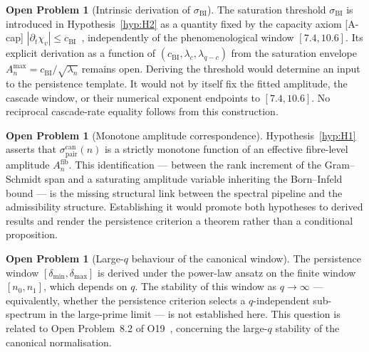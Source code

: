 \documentclass[11pt,a4paper]{article}
\theoremstyle{definition}
\newtheorem{openproblem}[theorem]{Open Problem}
\theoremstyle{remark}
\begin{document}
      \begin{openproblem}[Intrinsic derivation of $\sigma_{\mathrm{BI}}$]
        \label{op:sigma-BI-disc}
        The saturation threshold $\sigma_{\mathrm{BI}}$ is introduced in
        Hypothesis~\ref{hyp:H2} as a quantity fixed by the capacity axiom
        [A-cap] $|\partial_t \chi_v| \leq c_{\mathrm{BI}}$~\cite{Beau2026c},
        independently of the phenomenological window $[7.4, 10.6]$.
        Its explicit derivation as a function of $(c_{\mathrm{BI}}, \lambda_c,
        \lambda_{q-c})$ from the saturation envelope
        $A_n^{\max} = c_{\mathrm{BI}} / \sqrt{\lambda_n}$ remains open.
        Deriving the threshold would determine an input to the persistence template.
        It would not by itself fix the fitted amplitude, the cascade window, or their numerical
        exponent endpoints to $[7.4,10.6]$.
        No reciprocal cascade-rate equality follows from this construction.
      \end{openproblem}

      \begin{openproblem}[Monotone amplitude correspondence]
        \label{op:H1-derivation}
        Hypothesis~\ref{hyp:H1} asserts that
        $\sigma_{\mathrm{pair}}^{\mathrm{can}}(n)$ is a strictly monotone
        function of an effective fibre-level amplitude
        $A_n^{\mathrm{fib}}$.
        This identification --- between the rank increment of the
        Gram--Schmidt span and a saturating amplitude variable inheriting
        the Born--Infeld bound --- is the missing structural link between
        the spectral pipeline and the admissibility structure.
        Establishing it would promote both hypotheses to derived results and
        render the persistence criterion a theorem rather than a conditional
        proposition.
      \end{openproblem}

      \begin{openproblem}[Large-$q$ behaviour of the canonical window]
        \label{op:large-q}
        The persistence window $[\delta_{\min}, \delta_{\max}]$ is derived
        under the power-law ansatz on the finite window $[n_0, n_1]$,
        which depends on $q$.
        The stability of this window as $q \to \infty$ --- equivalently,
        whether the persistence criterion selects a $q$-independent
        sub-spectrum in the large-prime limit --- is not established here.
        This question is related to Open Problem~8.2 of
        O19~\cite{Beau2026a23}, concerning the large-$q$ stability of the
        canonical normalisation.
      \end{openproblem}
\end{document}
